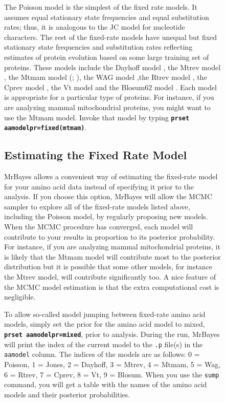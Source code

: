 \documentclass[12pt]{book}
\newcommand{\ttt}[1]{\texttt{#1}}
\newcommand{\tb}[1]{\ttt{\textbf{#1}}}
\begin{document}
\begin{figure}[h]
The Poisson model \citep{bishop87} is the simplest of the fixed rate models. It assumes equal
stationary state frequencies and equal substitution rates; thus, it is analogous to the JC model
for nucleotide characters. The rest of the fixed-rate models have unequal but fixed stationary
state frequencies and substitution rates reflecting estimates of protein evolution based on some
large training set of proteins. These models include the Dayhoff model \citep{dayhoff78}, the Mtrev
model \citep{adachi96}, the Mtmam model (\citet{cao98}; \citet{yang98}), the WAG model
\citep{whelan01},the Rtrev model \citep{dimmic02}, the Cprev model \citep{adachi00}, the Vt model
\citep{muller00} and the Blosum62 model \citep{henikoff92}. Each model is appropriate for a
particular type of proteins. For instance, if you are analyzing mammal mitochondrial proteins, you
might want to use the Mtmam model. Invoke that model by typing \tb{prset aamodelpr=fixed(mtmam)}.

\subsection{Estimating the Fixed Rate Model}
\label{estimatingTheFixedRateModel}

MrBayes allows a convenient way of estimating the fixed-rate model for your amino acid data instead
of specifying it prior to the analysis. If you choose this option, MrBayes will allow the MCMC
sampler to explore all of the fixed-rate models listed above, including the Poisson model, by
regularly proposing new models. When the MCMC procedure has converged, each model will contribute
to your results in proportion to its posterior probability. For instance, if you are analyzing
mammal mitochondrial proteins, it is likely that the Mtmam model will contribute most to the
posterior distribution but it is possible that some other models, for instance the Mtrev model,
will contribute significantly too. A nice feature of the MCMC model estimation is that the extra
computational cost is negligible.

To allow so-called model jumping between fixed-rate amino acid models, simply set the prior for the
amino acid model to mixed, \tb{prset aamodelpr=mixed}, prior to analysis. During the run, MrBayes
will print the index of the current model to the \ttt{.p} file(s) in the \ttt{aamodel} column. The
indices of the models are as follows: 0 = Poisson, 1 = Jones, 2 = Dayhoff, 3 = Mtrev, 4 = Mtmam, 5
= Wag, 6 = Rtrev, 7 = Cprev, 8 = Vt, 9 = Blosum. When you use the \ttt{sump} command, you will get
a table with the names of the amino acid models and their posterior probabilities.


\end{figure}
\end{document}
